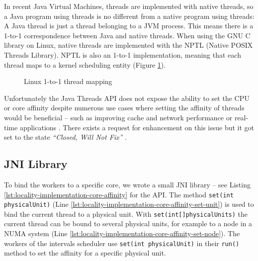 In recent Java Virtual Machines, threads are implemented with native
threads, so a Java program using threads is no different from a native
program using threads: A Java thread is just a thread belonging to a
JVM process. This means there is a 1-to-1 correspondence between Java
and native threads. When using the GNU C library on Linux, native
threads are implemented with the NPTL (Native POSIX Threads
Library). NPTL is also an 1-to-1 implementation, meaning that each
thread maps to a kernel scheduling entity (Figure
\ref{fig:locality-implementation-core-affinity-thread-mapping}).

\begin{figure}[htb]
  \centering
  \caption{Linux 1-to-1 thread mapping}
  \label{fig:locality-implementation-core-affinity-thread-mapping}
\end{figure}

Unfortunately the Java Threads API does not expose the ability to set
the CPU or core affinity despite numerous use cases where setting the
affinity of threads would be beneficial -- such as improving cache and
network performance or real-time applications \cite{Love2003, Dow2005,
  Foong2008}. There exists a request for enhancement on this issue but
it got set to the state \emph{``Closed, Will Not Fix''}
\cite{Oracle1999}.

\subsection{JNI Library}
\label{sec:locality-implementation-core-affinity-jni-library}

To bind the workers to a specific core, we wrote a small JNI library
-- see Listing \ref{lst:locality-implementation-core-affinity} for the
API. The method \lstinline!set(int physicalUnit)!  (Line
\ref{lst:locality-implementation-core-affinity-set-unit}) is used to
bind the current thread to a physical unit. With
\lstinline!set(int[]physicalUnits)! the current thread can be bound to
several physical units, for example to a node in a NUMA system (Line
\ref{lst:locality-implementation-core-affinity-set-node}). The workers
of the intervals scheduler use \lstinline!set(int physicalUnit)! in
their \lstinline!run()! method to set the affinity for a specific
physical unit.

